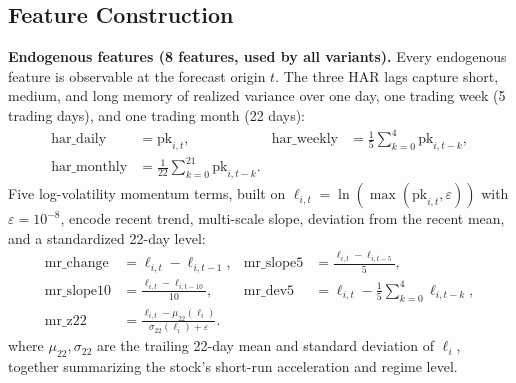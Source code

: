 \documentclass[runningheads,a4paper]{llncs}
\begin{document}
\subsection{Feature Construction}
\textbf{Endogenous features (8 features, used by all variants).} Every endogenous feature is observable at the
forecast origin $t$. The three HAR lags capture short, medium, and long memory of realized variance
over one day, one trading week (5 trading days), and one trading month (22 days):
\begin{align}
\mathrm{har\_daily} &= \mathrm{pk}_{i,t}, &
\mathrm{har\_weekly} &= \frac{1}{5}\sum_{k=0}^{4}\mathrm{pk}_{i,t-k},\\
\mathrm{har\_monthly} &= \frac{1}{22}\sum_{k=0}^{21}\mathrm{pk}_{i,t-k}. &&
\end{align}
Five log-volatility momentum terms, built on $\ell_{i,t}=\ln(\max(\mathrm{pk}_{i,t},\varepsilon))$ with
$\varepsilon=10^{-8}$, encode recent trend, multi-scale slope, deviation from the recent mean, and a
standardized 22-day level:
\begin{align}
\mathrm{mr\_change} &= \ell_{i,t}-\ell_{i,t-1}, &
\mathrm{mr\_slope5} &= \frac{\ell_{i,t}-\ell_{i,t-5}}{5},\\
\mathrm{mr\_slope10} &= \frac{\ell_{i,t}-\ell_{i,t-10}}{10}, &
\mathrm{mr\_dev5} &= \ell_{i,t}-\frac{1}{5}\sum_{k=0}^{4}\ell_{i,t-k},\\
\mathrm{mr\_z22} &= \frac{\ell_{i,t}-\mu_{22}(\ell_i)}{\sigma_{22}(\ell_i)+\varepsilon}. &&
\end{align}
where $\mu_{22},\sigma_{22}$ are the trailing 22-day mean and standard deviation of $\ell_i$, together
summarizing the stock's short-run acceleration and regime level.
\end{document}
